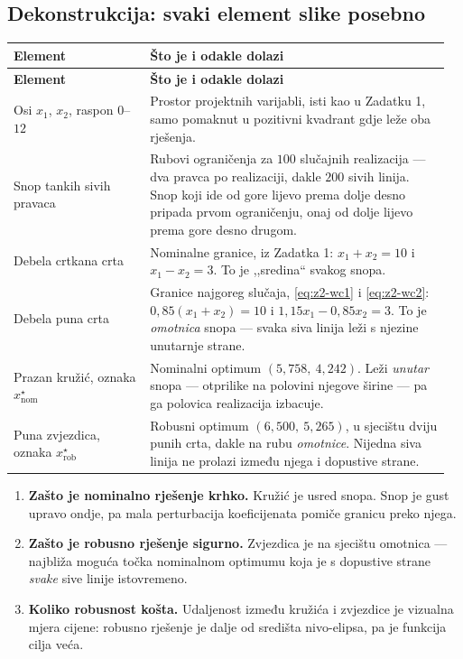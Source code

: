 \subsection{Dekonstrukcija: svaki element slike posebno}

\begin{longtable}{@{}p{0.30\linewidth} p{0.66\linewidth}@{}}
\toprule
\textbf{Element} & \textbf{Što je i odakle dolazi} \\
\midrule
\endfirsthead
\toprule
\textbf{Element} & \textbf{Što je i odakle dolazi} \\
\midrule
\endhead
Osi $x_1$, $x_2$, raspon $0$--$12$ & Prostor projektnih varijabli, isti kao u
Zadatku 1, samo pomaknut u pozitivni kvadrant gdje leže oba rješenja. \\[5pt]
Snop tankih sivih pravaca & Rubovi ograničenja za $100$ slučajnih realizacija ---
dva pravca po realizaciji, dakle $200$ sivih linija. Snop koji ide od gore
lijevo prema dolje desno pripada prvom ograničenju, onaj od dolje lijevo prema
gore desno drugom. \\[5pt]
Debela crtkana crta & Nominalne granice, iz Zadatka 1: $x_1 + x_2 = 10$ i
$x_1 - x_2 = 3$. To je ,,sredina`` svakog snopa. \\[5pt]
Debela puna crta & Granice najgoreg slučaja, \eqref{eq:z2-wc1} i
\eqref{eq:z2-wc2}: $0{,}85(x_1+x_2) = 10$ i $1{,}15x_1 - 0{,}85x_2 = 3$. To je
\emph{omotnica} snopa --- svaka siva linija leži s njezine unutarnje strane. \\[5pt]
Prazan kružić, oznaka $x_{\mathrm{nom}}^{\star}$ & Nominalni optimum
$(5{,}758,\ 4{,}242)$. Leži \emph{unutar} snopa --- otprilike na polovini
njegove širine --- pa ga polovica realizacija izbacuje. \\[5pt]
Puna zvjezdica, oznaka $x_{\mathrm{rob}}^{\star}$ & Robusni optimum
$(6{,}500,\ 5{,}265)$, u sjecištu dviju punih crta, dakle na rubu \emph{omotnice}.
Nijedna siva linija ne prolazi između njega i dopustive strane. \\
\bottomrule
\end{longtable}

\begin{korak}
\begin{enumerate}[leftmargin=*]
  \item \textbf{Zašto je nominalno rješenje krhko.} Kružić je usred snopa. Snop
        je gust upravo ondje, pa mala perturbacija koeficijenata pomiče granicu
        preko njega.
  \item \textbf{Zašto je robusno rješenje sigurno.} Zvjezdica je na sjecištu
        omotnica --- najbliža moguća točka nominalnom optimumu koja je s
        dopustive strane \emph{svake} sive linije istovremeno.
  \item \textbf{Koliko robusnost košta.} Udaljenost između kružića i zvjezdice je
        vizualna mjera cijene: robusno rješenje je dalje od središta nivo-elipsa,
        pa je funkcija cilja veća.
\end{enumerate}
\end{korak}

